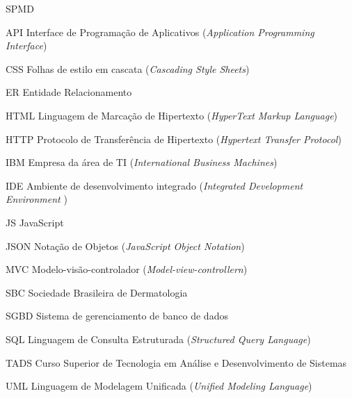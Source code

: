 \documentclass[openright]{ifrs} %
\begin{document}
\begin{listofabbrv}{SPMD}
        \item[API]Interface de Programação de Aplicativos (\textit{Application Programming Interface})
        \item[CSS] Folhas de estilo em cascata (\textit{Cascading Style Sheets})
        \item[ER] Entidade Relacionamento
        \item[HTML]Linguagem de Marcação de Hipertexto
        (\textit{HyperText Markup Language})
        \item[HTTP] Protocolo de Transferência de Hipertexto
        (\textit{Hypertext Transfer Protocol})
        \item[IBM] Empresa da área de TI (\textit{International Business Machines})
        \item[IDE] Ambiente de desenvolvimento integrado (\textit{Integrated Development Environment }) 
        \item[JS] JavaScript
        \item[JSON] Notação de Objetos 
        (\textit{JavaScript Object Notation})
         \item[MVC] Modelo-visão-controlador
        (\textit{Model-view-controllern})
        
        \item[SBC] Sociedade Brasileira de Dermatologia
        \item[SGBD] Sistema de gerenciamento de banco de dados
        \item[SQL] Linguagem de Consulta Estruturada (\textit{Structured Query Language})
        \item[TADS] Curso Superior de Tecnologia em Análise e Desenvolvimento de Sistemas
        \item[UML] Linguagem de Modelagem Unificada (\textit{Unified Modeling Language})
        
        
\end{listofabbrv}

\listoffigures

\listoftables

\end{document}
